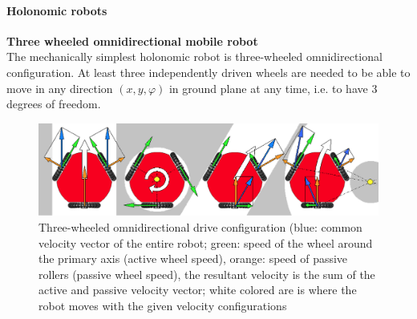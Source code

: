 \documentclass[12pt,english,twoside]{article}
\begin{document}
\paragraph{Holonomic robots}
\noindent \textbf{Three wheeled omnidirectional mobile robot} \\
The mechanically simplest holonomic robot is three-wheeled omnidirectional configuration. At least three independently driven wheels are needed to be able to move in any direction $(x,y,\varphi)$ in ground plane at any time, i.e. to have 3 degrees of freedom.
\begin{figure}[htb!]
	\centering
	\includegraphics[width=15cm]{figures/omniconfig.png}
	\caption{Three-wheeled omnidirectional drive configuration (blue: common velocity vector of the entire robot; 
		green: speed of the wheel around the primary axis (active wheel speed), orange: speed of passive rollers (passive wheel speed), the resultant velocity is the sum of the active and passive velocity vector; white colored are is where the robot moves with the given velocity configurations \cite{rirt}}
	\label{omniconfig}
\end{figure}
\end{document}

